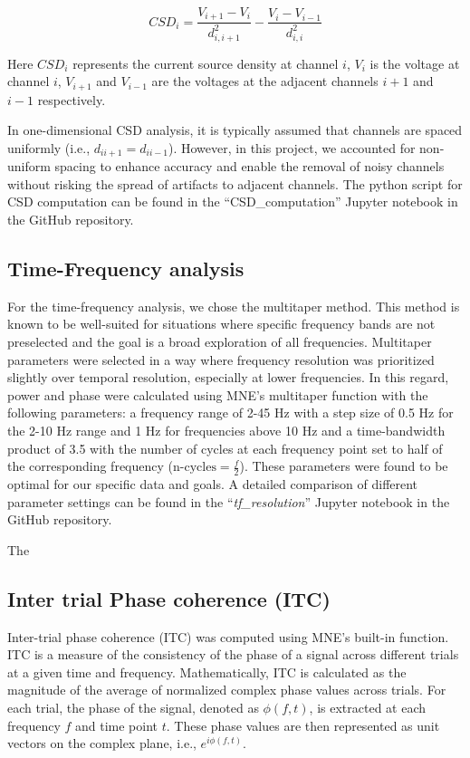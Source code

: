 \documentclass[
  letterpaper,
  DIV=11,
  numbers=noendperiod]{scrartcl}
\begin{document}
\[
CSD_i = \frac{V_{i+1} - V_i}{d_{i, i+1}^2} - \frac{V_i - V_{i-1}}{d_{i, i}^2}
\]

Here \(CSD_i\) represents the current source density at channel \(i\),
\(V_i\) is the voltage at channel \(i\), \(V_{i+1}\) and \(V_{i-1}\) are
the voltages at the adjacent channels \(i+1\) and \(i-1\) respectively.

In one-dimensional CSD analysis, it is typically assumed that channels
are spaced uniformly (i.e., \(d_{i i+1} = d_{i i-1}\)). However, in this
project, we accounted for non-uniform spacing to enhance accuracy and
enable the removal of noisy channels without risking the spread of
artifacts to adjacent channels. The python script for CSD computation
can be found in the ``CSD\_computation'' Jupyter notebook in the GitHub
repository.

\subsection{Time-Frequency analysis}\label{time-frequency-analysis}

For the time-frequency analysis, we chose the multitaper method. This
method is known to be well-suited for situations where specific
frequency bands are not preselected and the goal is a broad exploration
of all frequencies. Multitaper parameters were selected in a way where
frequency resolution was prioritized slightly over temporal resolution,
especially at lower frequencies. In this regard, power and phase were
calculated using MNE's multitaper function with the following
parameters: a frequency range of 2-45 Hz with a step size of 0.5 Hz for
the 2-10 Hz range and 1 Hz for frequencies above 10 Hz and a
time-bandwidth product of 3.5 with the number of cycles at each
frequency point set to half of the corresponding frequency
(\(\text{n-cycles} = \frac{f}{2}\)). These parameters were found to be
optimal for our specific data and goals. A detailed comparison of
different parameter settings can be found in the
``\emph{tf\_resolution}'' Jupyter notebook in the GitHub repository.

The

\subsection{Inter trial Phase coherence
(ITC)}\label{inter-trial-phase-coherence-itc}

Inter-trial phase coherence (ITC) was computed using MNE's built-in
function. ITC is a measure of the consistency of the phase of a signal
across different trials at a given time and frequency. Mathematically,
ITC is calculated as the magnitude of the average of normalized complex
phase values across trials. For each trial, the phase of the signal,
denoted as \(\phi(f, t)\), is extracted at each frequency \(f\) and time
point \(t\). These phase values are then represented as unit vectors on
the complex plane, i.e., \(e^{i\phi(f, t)}\).
\end{document}
